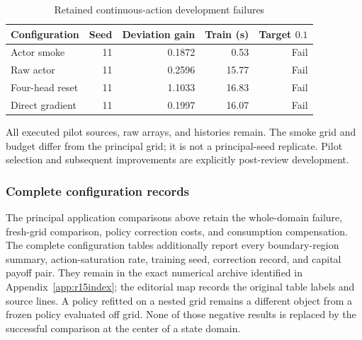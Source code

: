 \documentclass[ecta,nameyear,draft]{econsocart}
\theoremstyle{definition}
\theoremstyle{remark}
\begin{document}
\begin{table}[htbp]\centering
\caption{Retained continuous-action development failures}
\begin{small}\begin{tabular}{lrrrr}
\toprule
Configuration & Seed & Deviation gain & Train (s) & Target $0.1$ \\
\midrule
Actor smoke & 11 & 0.1872 & 0.53 & Fail \\
Raw actor & 11 & 0.2596 & 15.77 & Fail \\
Four-head reset & 11 & 1.1033 & 16.83 & Fail \\
Direct gradient & 11 & 0.1997 & 16.07 & Fail \\
\bottomrule\end{tabular}\end{small}
\par\smallskip\begin{minipage}{0.96\linewidth}\footnotesize All executed pilot sources, raw arrays, and histories remain. The smoke grid and budget differ from the principal grid; it is not a principal-seed replicate. Pilot selection and subsequent improvements are explicitly post-review development.\end{minipage}
\end{table}



\subsubsection{Complete configuration records}
The principal application comparisons above retain the whole-domain failure,
fresh-grid comparison, policy correction costs, and consumption compensation.
The complete configuration tables additionally report every boundary-region
summary, action-saturation rate, training seed, correction record, and capital
payoff pair. They remain in the exact numerical archive identified in
Appendix~\ref{app:r15index}; the editorial map records the original table
labels and source lines. A policy refitted on a nested grid remains a different
object from a frozen policy evaluated off grid. None of those negative results
is replaced by the successful comparison at the center of a state domain.



\end{document}
